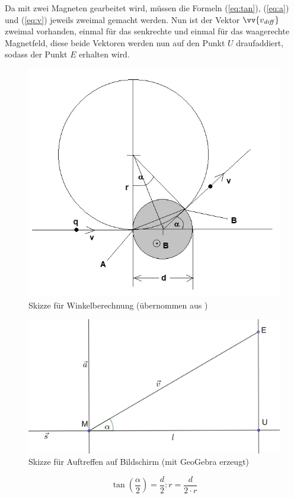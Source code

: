 Da mit zwei Magneten gearbeitet wird, müssen die Formeln (\ref{eq:tan}), (\ref{eq:a}) und (\ref{eq:v}) jeweils zweimal gemacht werden.
Nun ist der Vektor $\vv{v_\mathit{diff}}$ zweimal vorhanden, einmal für das senkrechte und einmal für das waagerechte Magnetfeld, diese beide Vektoren werden nun auf den Punkt $U$ draufaddiert, sodass der Punkt $E$ erhalten wird.
\begin{figure}
    \centering
    \includegraphics[width=.75\textwidth]{fig/elektronenstrahl-ablenkung_101.jpg}
    \caption{Skizze für Winkelberechnung (übernommen aus \cite{Blog})}
    \label{fig:ausBlog}
\end{figure}

\begin{figure}
    \centering
    \includegraphics[width=.75\textwidth]{fig/Bildschirm_Skizze.png}
    \caption{Skizze für Auftreffen auf Bildschirm (mit GeoGebra erzeugt)}
    \label{fig:Schirm}
\end{figure}

\begin{equation}
    \label{eq:tan}
    \tan(\frac{\alpha}{2}) = \frac{d}{2}:r = \frac{d}{2 \cdot r}
\end{equation}

